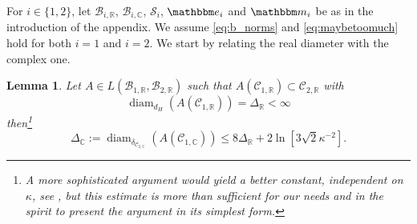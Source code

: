\documentclass{amsart}
\numberwithin{equation}{section}
\newtheorem{lem}[thm]{Lemma}
\newcommand\cB{{\mathcal B}}
\newcommand\cC{{\mathcal C}}
\newcommand\cS{{\mathcal S}}
\newcommand\bC{{\mathbb C}}
\newcommand\bR{{\mathbb R}}
\newcommand{\bbe}{\mathbbm e}
\newcommand{\bbm}{\mathbbm m}
\newcommand{\diam}{\operatorname{diam}}
\begin{document}
For $i\in\{1,2\}$, let  $\cB_{i,\bR}$, $\cB_{i,\bC}$, $\cS_i$, $\bbe_i$ and $\bbm_i$ be as in the introduction of the appendix.
We assume \eqref{eq:b_norms} and \eqref{eq:maybetoomuch} hold for both $i=1$ and $i=2$.
We start by relating the real diameter with the complex one.

\begin{lem}\label{lem:diam_rel}
Let $A\in L(\cB_{1,\bR},\cB_{2,\bR})$ such that $A(\cC_{1,\bR})\subset \cC_{2,\bR}$ with 
\[
\diam_{d_H}(A(\cC_{1,\bR}))=\Delta_\bR<\infty
\]
then\footnote{A more sophisticated argument would yield a better constant, independent on $\kappa$, see \cite{Du11}, but this estimate is more than sufficient for our needs and in the spirit to present the argument in its simplest form.}
\[
\Delta_{\bC} :=\diam_{\delta_{\cC_{2,\bC}}}(A(\cC_{1,\bC}))\leq 8\Delta_\bR + 2 \ln[  3\sqrt{2} \kappa^{-2} ].
\]
\end{lem}
\end{document}
